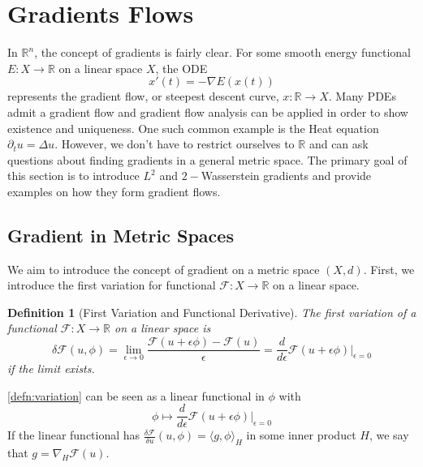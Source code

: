 \documentclass[12pt]{article}
\newcommand{\R}{\mathbb{R}}
\theoremstyle{plain}
\newtheorem{defn}{Definition}[section]
\numberwithin{equation}{section}
\begin{document}
\section{Gradients Flows}
In $\R^n$, the concept of gradients is fairly clear. For some smooth energy functional $E: X\to\R$ on a linear space $X$, the ODE 
\[x'(t) = -\nabla E(x(t))\]
represents the gradient flow, or steepest descent curve, $x : \R\to X$. Many PDEs admit a gradient flow and gradient flow analysis can be applied in order to show existence and uniqueness. One such common example is the Heat equation $\partial_t u = \Delta u$.
However, we don't have to restrict ourselves to $\R$ and can ask questions about finding gradients in a general metric space. The primary goal of this section is to introduce $L^2$ and $2-$Wasserstein gradients and provide examples on how they form gradient flows.
\subsection{Gradient in Metric Spaces}
We aim to introduce the concept of gradient on a metric space $(X,d)$. First, we introduce the first variation for functional $\mathcal{F}: X\to \R$ on a linear space.
\begin{defn}[First Variation and Functional Derivative]\label{defn:variation}
  The first variation of a functional $\mathcal{F} : X\to \R$ on a linear space is
  \[\delta \mathcal{F}(u, \phi) = \lim_{\epsilon\to 0} \frac{\mathcal{F}(u+\epsilon \phi) - \mathcal{F}(u)}{\epsilon} = \frac{d}{d\epsilon}\mathcal{F}(u+\epsilon \phi)\bigg\vert_{\epsilon=0}\]
  if the limit exists. 
\end{defn}
\autoref{defn:variation} can be seen as a linear functional in $\phi$ with 
\[\phi \mapsto \frac{d}{d\epsilon}\mathcal{F}(u + \epsilon \phi)\bigg\vert_{\epsilon = 0}\]
If the linear functional has $\frac{\delta \mathcal{F}}{\delta u}(u,\phi) = \langle g, \phi\rangle_H$ in some inner product $H$, we say that $g = \nabla_H \mathcal{F}(u).$
\end{document}
